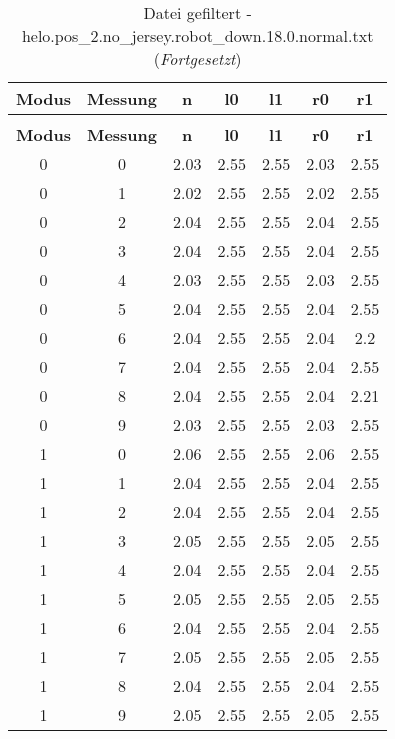 \clearpage{}
\begin{longtable}{|c|c||c||c|c||c|c|}
	\caption{Datei gefiltert - helo.pos\_2.no\_jersey.robot\_down.18.0.normal.txt} \label{tab:helo.pos-2.no-jersey.robot-down.18.0.normal.txt} \\ \hline
	\textbf{Modus} & \textbf{Messung} & \textbf{n} & \textbf{l0} & \textbf{l1} & \textbf{r0} & \textbf{r1}\\ \hline
	\endfirsthead
	\caption[]{Datei gefiltert - helo.pos\_2.no\_jersey.robot\_down.18.0.normal.txt (\emph{Fortgesetzt})} \\ \hline
	\textbf{Modus} & \textbf{Messung} & \textbf{n} & \textbf{l0} & \textbf{l1} & \textbf{r0} & \textbf{r1}\\ \hline
	\endhead
	0 & 0 & 2.03 & 2.55 & 2.55 & 2.03 & 2.55 \\ \hline
	0 & 1 & 2.02 & 2.55 & 2.55 & 2.02 & 2.55 \\ \hline
	0 & 2 & 2.04 & 2.55 & 2.55 & 2.04 & 2.55 \\ \hline
	0 & 3 & 2.04 & 2.55 & 2.55 & 2.04 & 2.55 \\ \hline
	0 & 4 & 2.03 & 2.55 & 2.55 & 2.03 & 2.55 \\ \hline
	0 & 5 & 2.04 & 2.55 & 2.55 & 2.04 & 2.55 \\ \hline
	0 & 6 & 2.04 & 2.55 & 2.55 & 2.04 & 2.2 \\ \hline
	0 & 7 & 2.04 & 2.55 & 2.55 & 2.04 & 2.55 \\ \hline
	0 & 8 & 2.04 & 2.55 & 2.55 & 2.04 & 2.21 \\ \hline
	0 & 9 & 2.03 & 2.55 & 2.55 & 2.03 & 2.55 \\ \hline
	1 & 0 & 2.06 & 2.55 & 2.55 & 2.06 & 2.55 \\ \hline
	1 & 1 & 2.04 & 2.55 & 2.55 & 2.04 & 2.55 \\ \hline
	1 & 2 & 2.04 & 2.55 & 2.55 & 2.04 & 2.55 \\ \hline
	1 & 3 & 2.05 & 2.55 & 2.55 & 2.05 & 2.55 \\ \hline
	1 & 4 & 2.04 & 2.55 & 2.55 & 2.04 & 2.55 \\ \hline
	1 & 5 & 2.05 & 2.55 & 2.55 & 2.05 & 2.55 \\ \hline
	1 & 6 & 2.04 & 2.55 & 2.55 & 2.04 & 2.55 \\ \hline
	1 & 7 & 2.05 & 2.55 & 2.55 & 2.05 & 2.55 \\ \hline
	1 & 8 & 2.04 & 2.55 & 2.55 & 2.04 & 2.55 \\ \hline
	1 & 9 & 2.05 & 2.55 & 2.55 & 2.05 & 2.55 \\ \hline

\end{longtable}

